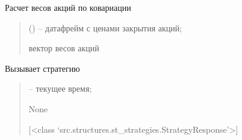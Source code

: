\documentclass[letterpaper,10pt,english,openany,oneside]{sphinxmanual}
\begin{document}
\begin{fulllineitems}
\begin{fulllineitems}
\end{fulllineitems}


\begin{fulllineitems}
\label{\detokenize{src.structures:src.structures.st_portfolio.Portfolio.calc_shares}}
\pysigstartsignatures
{}
\pysigstopsignatures
\sphinxAtStartPar
Расчет весов акций по ковариации
\begin{quote}\begin{description}
\sphinxAtStartPar
{} (\sphinxstyleliteralemphasis{\sphinxupquote{{[}}}\sphinxstyleliteralemphasis{\sphinxupquote{{]}}}) – датафрейм с ценами закрытия акций;

\sphinxAtStartPar
вектор весов акций

\sphinxAtStartPar
{}

\end{description}\end{quote}

\end{fulllineitems}


\begin{fulllineitems}
\label{\detokenize{src.structures:src.structures.st_portfolio.Portfolio.call_strategy}}
\pysigstartsignatures
{}
\pysigstopsignatures
\sphinxAtStartPar
Вызывает стратегию
\begin{quote}\begin{description}
\sphinxAtStartPar
{} – текущее время;

\sphinxAtStartPar
None

\sphinxAtStartPar
{[}<class ‘src.structures.st\_strategies.StrategyResponse’>{]}


\end{description}
\end{quote}
\end{fulllineitems}
\end{fulllineitems}
\end{document}
